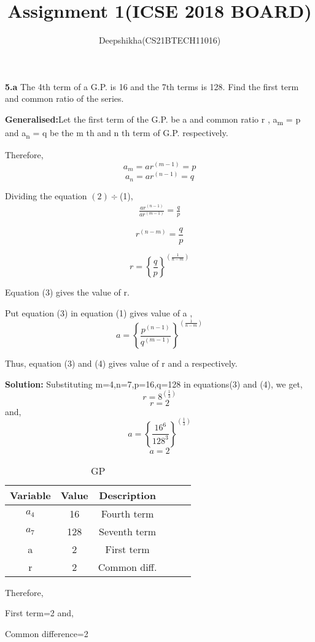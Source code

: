 \documentclass[journal, 12pt, twocolumn]{IEEEtran}
\begin{document}
\title{Assignment 1(ICSE 2018 BOARD)}
\author{Deepshikha(CS21BTECH11016)}
\maketitle

\textbf{5.a}
The 4th term of a G.P. is 16 and the 7th terms is 128. Find the first term and common ratio of the series.


\textbf{Generalised:}Let the first term of the G.P. be a and common ratio r
, a\textsubscript m = p and a\textsubscript n = q be the m th  and n th term of G.P. respectively.


Therefore,
\begin{equation}
    a_m=ar^{(m-1)} = p
\end{equation}
\begin{equation}
    a_n=ar^{(n-1)} = q
\end{equation}

Dividing the equation $(2)\div$(1),
\begin{align*}
    \frac{ar^{(n-1)}}{ar^{(m-1)}}=\frac{q}{p} 
\end{align*}


\[r^{(n-m)}=\frac{q}{p}\]



\begin{equation}
    r =\left\{\frac{q}{p}\right\}^{(\frac{1}{n-m})}
\end{equation}

Equation (3) gives the value of r.

Put equation (3) in equation (1) gives value of a ,
\begin{equation}
    a=\left\{\frac{p^{(n-1)}}{q^{(m-1)}}\right\}^{({\frac{1}{n-m}})}
\end{equation}

Thus, equation (3) and (4) gives value of r and a respectively.




\textbf{Solution:}
Substituting m=4,n=7,p=16,q=128 in equations(3) and (4),
we get,
\[r=8^{(\frac{1}{3})}\]
\[r=2\]
and,
\[ a=\left\{\frac{16^{6}}{128^{3}}\right\}^{({\frac{1}{3}})}\]
\[a=2\]

\begin{table}[ht]
    \centering
    \begin{tabular}{|c|c|c|c|c|c|}
    \hline
    Variable & Value & Description\\
    \hline\hline
    $a_4$ & 16 & Fourth term\\
    $a_7$ & 128 & Seventh term\\
    a & 2 & First term\\
    r & 2 & Common diff.\\
    \hline
    \end{tabular}
    \caption{GP}
    \label{Table}
\end{table}

Therefore, 

First term=2 and,


Common difference=2
\end{document}
